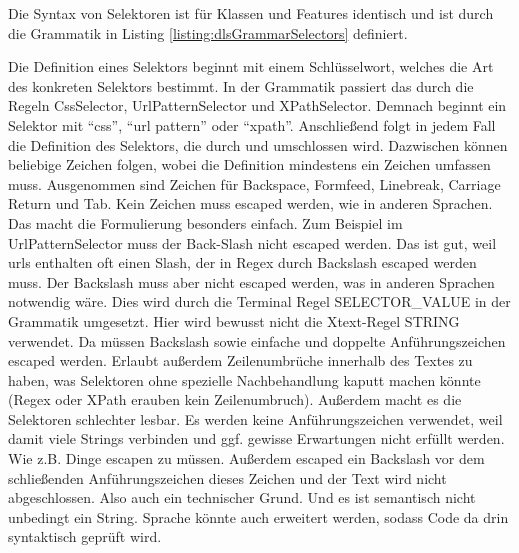     Die Syntax von Selektoren ist für Klassen und Features identisch
    und ist durch die Grammatik in Listing \ref{listing:dlsGrammarSelectors} definiert.

    

    Die Definition eines Selektors beginnt mit einem Schlüsselwort,
    welches die Art des konkreten Selektors bestimmt.
    In der Grammatik passiert das durch die Regeln
    CssSelector, UrlPatternSelector und XPathSelector.
    Demnach beginnt ein Selektor mit "`css"', "`url pattern"' oder "`xpath"'.
    Anschließend folgt in jedem Fall die Definition des Selektors,
    die durch {\flqq } und {\frqq } umschlossen wird.
    Dazwischen können beliebige Zeichen folgen, wobei die Definition mindestens ein Zeichen umfassen muss.
    Ausgenommen sind Zeichen für Backspace, Formfeed, Linebreak, Carriage Return und Tab.
    Kein Zeichen muss escaped werden, wie in anderen Sprachen.
    Das macht die Formulierung besonders einfach.
    Zum Beispiel im UrlPatternSelector muss der Back-Slash nicht escaped werden.
    Das ist gut, weil \glspl{url} enthalten oft einen Slash, der in Regex
    durch Backslash escaped werden muss.
    Der Backslash muss aber nicht escaped werden, was in anderen Sprachen notwendig wäre.
    Dies wird durch die Terminal Regel SELECTOR\_VALUE in der Grammatik umgesetzt.
    Hier wird bewusst nicht die Xtext-Regel STRING verwendet.
    Da müssen Backslash sowie einfache und doppelte Anführungszeichen escaped werden.
    Erlaubt außerdem Zeilenumbrüche innerhalb des Textes zu haben,
    was Selektoren ohne spezielle Nachbehandlung kaputt machen könnte (Regex oder XPath erauben kein Zeilenumbruch).
    Außerdem macht es die Selektoren schlechter lesbar.
    Es werden keine Anführungszeichen verwendet, weil damit viele Strings verbinden
    und ggf. gewisse Erwartungen nicht erfüllt werden. Wie z.B. Dinge escapen zu müssen.
    Außerdem escaped ein Backslash vor dem schließenden Anführungszeichen dieses Zeichen
    und der Text wird nicht abgeschlossen. Also auch ein technischer Grund.
    Und es ist semantisch nicht unbedingt ein String.
    Sprache könnte auch erweitert werden, sodass Code da drin syntaktisch geprüft wird.